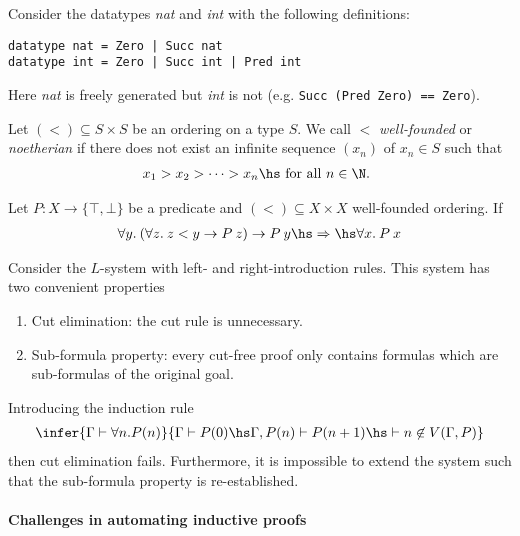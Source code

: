 \documentclass{article}
\begin{document}
\begin{example}
	Consider the datatypes \emph{nat} and \emph{int} with the following definitions:
	\begin{verbatim}
datatype nat = Zero | Succ nat
datatype int = Zero | Succ int | Pred int
    \end{verbatim}
	Here \emph{nat} is freely generated but \emph{int} is not (e.g. \texttt{Succ (Pred Zero) == Zero}).
\end{example}

\begin{definition}
	Let $(<) \subseteq S\times S$ be an ordering on a type $S$. We call $<$ \emph{well-founded} or
	\emph{noetherian} if there does not exist an infinite sequence $(x_n)$ of $x_n\in S$ such that
	\begin{align*}
		x_1 > x_2 > \cdots > x_n\hs\text{ for all $n\in\N$.  }
	\end{align*}
\end{definition}

\begin{theorem}
	Let $P:X\to\{\top,\bot\}$ be a predicate and $(<)\subseteq X\times X$ well-founded ordering.
	If
	\begin{align*}
		\forall y.\:(\forall z.\:z < y \to P\:z) \to P\:y
		\hs\Rightarrow\hs
		\forall x.\:P\:x
	\end{align*}
\end{theorem}

\begin{theorem}
	Consider the $L$-system with left- and right-introduction rules. This system has two
	convenient properties
	\begin{enumerate}
		\item Cut elimination: the cut rule is unnecessary.
		\item Sub-formula property: every cut-free proof only contains formulas which are sub-formulas of the original goal.
	\end{enumerate}
	Introducing the induction rule
	\begin{align*}
		\infer{\Gamma \vdash \forall n. P(n)}{\Gamma \vdash P(0) \hs \Gamma,P(n)\vdash P(n+1) \hs \vdash n\not\in V(\Gamma, P)}
	\end{align*}
	then cut elimination fails. Furthermore, it is impossible to extend the system such that
	the sub-formula property is re-established.
\end{theorem}

\paragraph{Challenges in automating inductive proofs}
\end{document}
